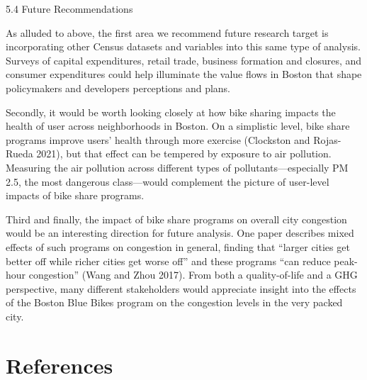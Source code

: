 \documentclass[
  12pt,
]{article}
\begin{document}
5.4 Future Recommendations

As alluded to above, the first area we recommend future research target
is incorporating other Census datasets and variables into this same type
of analysis. Surveys of capital expenditures, retail trade, business
formation and closures, and consumer expenditures could help illuminate
the value flows in Boston that shape policymakers and developers
perceptions and plans.

Secondly, it would be worth looking closely at how bike sharing impacts
the health of user across neighborhoods in Boston. On a simplistic
level, bike share programs improve users' health through more exercise
(Clockston and Rojas-Rueda 2021), but that effect can be tempered by
exposure to air pollution. Measuring the air pollution across different
types of pollutants---especially PM 2.5, the most dangerous
class---would complement the picture of user-level impacts of bike share
programs.

Third and finally, the impact of bike share programs on overall city
congestion would be an interesting direction for future analysis. One
paper describes mixed effects of such programs on congestion in general,
finding that ``larger cities get better off while richer cities get
worse off'' and these programs ``can reduce peak-hour congestion'' (Wang
and Zhou 2017). From both a quality-of-life and a GHG perspective, many
different stakeholders would appreciate insight into the effects of the
Boston Blue Bikes program on the congestion levels in the very packed
city.

\newpage

\hypertarget{references}{%
\section{References}\label{references}}
\end{document}
